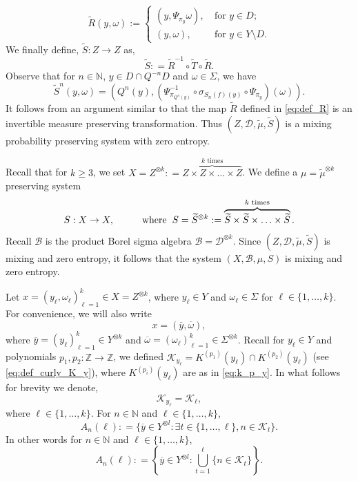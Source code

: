 \documentclass[12pt,reqno]{amsart}
\newcommand{\N}{\mathbb{N}}
\newcommand{\Z}{\mathbb{Z}}
\newcommand{\B}{\mathcal{B}}
\newcommand{\kay}{\mathcal{K}}
\newcommand{\TT}{\widetilde{T}}
\newcommand{\TS}{\widetilde{S}}
\newcommand{\Tmu}{\widetilde{\mu}}
\theoremstyle{definition}
\begin{document}
\begin{equation}\label{eq:def_R}
   \widetilde{R}(y,\omega) :=\begin{cases}
(y, \Psi_{\pi_y} \omega ), &\ \text{for}\,\, y \in D;\\
(y,\omega), &\ \text{for}\,\, y \in Y\setminus D.
\end{cases}
\end{equation} We finally define, $\TS : Z \rightarrow Z$ as, 
\begin{equation}\label{def:S}
    \TS : = \widetilde{R}^{-1} \circ \TT \circ \widetilde{R}.
\end{equation}
Observe that for $n \in \N$, $y \in D \cap Q^{-n} D$ and $\omega \in \Sigma$, we have
\begin{equation}\label{eq:TS^n_2}
    \TS^n(y, \omega) = (Q^n(y), (\Psi^{-1}_{\pi_{Q^n(y)}} \circ \sigma_{S_n(f)(y)} \circ \Psi_{\pi_y}) (\omega )).
\end{equation}
It follows from an argument similar to \cite[Proposition 4.10]{kosloff_Sanadhya_2024} that the map $\widetilde{R}$ defined in \eqref{eq:def_R} is an invertible measure preserving transformation. Thus $(Z,\mathcal{D},\Tmu,\TS)$ is a  mixing probability preserving system with zero entropy. 

Recall that for $k\geq3$, we set $X = Z^{\otimes k} : = \overbrace{Z \times Z \times\ldots \times Z}^\text{$k$ times}$. We define a $\mu=\tilde{\mu}^{\otimes k}$ preserving system
\[
S : X \rightarrow X, \hspace{10 mm} \mathrm{where} \hspace{2 mm} S = \TS^{\otimes k} : = \overbrace{\TS \times \TS \times\ldots \times \TS}^\text{$k$ times}.
\]
Recall $\B$ is the product Borel sigma algebra $\B = \mathcal{D}^{\otimes k}$. Since $(Z,\mathcal{D},\Tmu,\TS)$ is  mixing and zero entropy, it follows that the system $(X,\mathcal{B},\mu, S)$ is mixing and zero entropy.

Let $x = (y_\ell,\omega_\ell)_{\ell=1}^k \in X = Z^{\otimes k}$, where  $y_\ell \in Y$ and $\omega_\ell \in \Sigma$ for $\ell \in \{1,\ldots,k\}$. For convenience, we will also write 
\[
x = (\overline{y},\overline{\omega}),
\] where $\overline{y} = (y_\ell)_{\ell =1}^k \in Y^{\otimes k}$ and $\overline{\omega} = (\omega_\ell)_{\ell =1}^k \in \Sigma^{\otimes k}$. Recall for $y_\ell \in Y$ and polynomials $p_1,p_2 : \Z \rightarrow \Z$, we defined $\kay_{y_\ell}=K^{(p_1)}(y_\ell)\cap K^{(p_2)}(y_{\ell})$ (see \eqref{eq:def_curly_K_y}), where $K^{(p_i)}(y_\ell)$ are as in \eqref{eq:k_p_y}. 
In what follows for brevity we denote,
\[\kay_{y_\ell} = \kay_\ell,\]
where $\ell \in \{1,\ldots,k\}$. For $n \in \N$ and $\ell \in \{1,\ldots,k\}$,
\begin{equation}\label{def:A_n_ell}
    A_n(\ell) : = \{\overline{y} \in Y^{\otimes l} : \exists t \in \{1,\ldots,\ell\}, n \in \kay_t\}.
\end{equation} In other words for $n \in \N$ and $\ell \in \{1,\ldots,k\}$, 
\begin{equation}\label{def:A_n_ell*}
    A_n(\ell) : = \left\{\overline{y} \in Y^{\otimes l} : \bigcup_{t=1}^\ell \{n \in \kay_t\}\right\}.
\end{equation}
\end{document}
